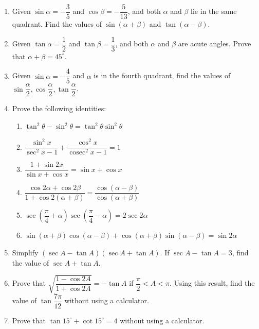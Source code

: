 \documentclass{report}
\begin{document}
\newpage
{}
\begin{enumerate}
	\item Given $\sin \alpha = -\dfrac{3}{5}$ and $\cos \beta = -\dfrac{5}{13}$, and both $\alpha$ and $\beta$ lie in the same quadrant. Find the values of $\sin (\alpha + \beta)$ and $\tan (\alpha - \beta)$.
	      
	\item Given $\tan \alpha = \dfrac{1}{2}$ and $\tan \beta = \dfrac{1}{3}$, and both $\alpha$ and $\beta$ are acute angles. Prove that $\alpha + \beta = 45^{\circ}$.
	      
	\item Given $\sin \alpha = -\dfrac{4}{5}$ and $\alpha$ is in the fourth quadrant, find the values of $\sin \dfrac{\alpha}{2}, \cos \dfrac{\alpha}{2}, \tan \dfrac{\alpha}{2}$.
	      
	\item Prove the following identities:
	      \begin{enumerate}
	      	\item $\tan ^2 \theta - \sin ^2 \theta = \tan ^2 \theta \sin ^2 \theta$
	      	\item $\dfrac{\sin ^2 x}{\sec ^2 x - 1} + \dfrac{\cos ^2 x}{\operatorname{cosec}^2 x - 1} = 1$
	      	\item $\dfrac{1 + \sin 2x}{\sin x + \cos x} = \sin x + \cos x$
	      	\item $\dfrac{\cos 2 \alpha + \cos 2 \beta}{1 + \cos 2(\alpha + \beta)} = \dfrac{\cos (\alpha - \beta)}{\cos (\alpha + \beta)}$
	      	\item $\sec \left(\dfrac{\pi}{4} + \alpha\right) \sec \left(\dfrac{\pi}{4} - \alpha\right) = 2 \sec 2 \alpha$
	      	\item $\sin (\alpha + \beta) \cos (\alpha - \beta) + \cos (\alpha + \beta) \sin (\alpha - \beta) = \sin 2 \alpha$
	      \end{enumerate}
	      
	\item Simplify $(\sec A - \tan A)(\sec A + \tan A)$. If $\sec A - \tan A = 3$, find the value of $\sec A + \tan A$.
	      
	\item Prove that $\sqrt{\dfrac{1 - \cos 2A}{1 + \cos 2A}} = -\tan A$ if $\dfrac{\pi}{2} < A < \pi$. Using this result, find the value of $\tan \dfrac{7 \pi}{12}$ without using a calculator.
	      
	\item Prove that $\tan 15^{\circ} + \cot 15^{\circ} = 4$ without using a calculator.
	      

\end{enumerate}
\end{document}

